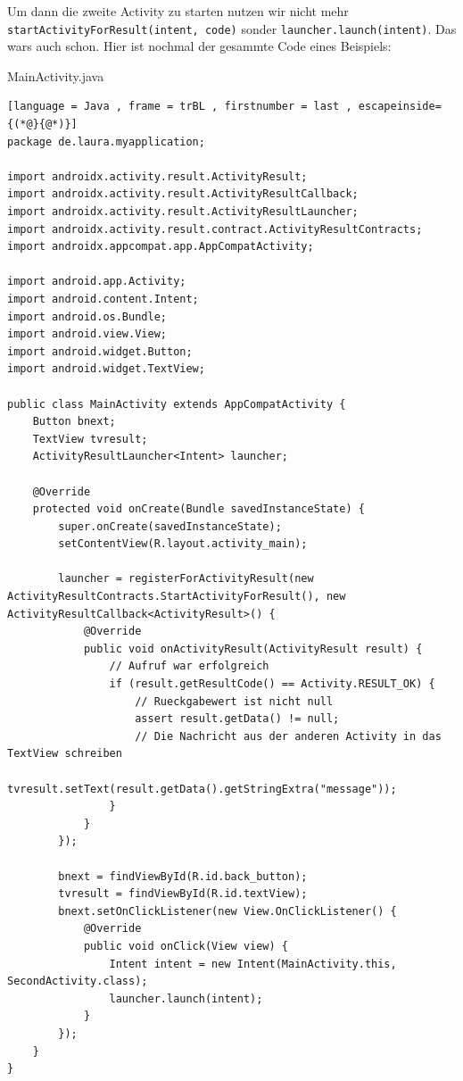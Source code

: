 \documentclass[8pt, letterpaper]{article}
\begin{document}
Um dann die zweite Activity zu starten nutzen wir nicht mehr \texttt{startActivityForResult(intent, code)} sonder \texttt{launcher.launch(intent)}.
Das wars auch schon. Hier ist nochmal der gesammte Code eines Beispiels:
\pagebreak

MainActivity.java
\begin{lstlisting}[language = Java , frame = trBL , firstnumber = last , escapeinside={(*@}{@*)}]
package de.laura.myapplication;

import androidx.activity.result.ActivityResult;
import androidx.activity.result.ActivityResultCallback;
import androidx.activity.result.ActivityResultLauncher;
import androidx.activity.result.contract.ActivityResultContracts;
import androidx.appcompat.app.AppCompatActivity;

import android.app.Activity;
import android.content.Intent;
import android.os.Bundle;
import android.view.View;
import android.widget.Button;
import android.widget.TextView;

public class MainActivity extends AppCompatActivity {
    Button bnext;
    TextView tvresult;
    ActivityResultLauncher<Intent> launcher;

    @Override
    protected void onCreate(Bundle savedInstanceState) {
        super.onCreate(savedInstanceState);
        setContentView(R.layout.activity_main);

        launcher = registerForActivityResult(new ActivityResultContracts.StartActivityForResult(), new ActivityResultCallback<ActivityResult>() {
            @Override
            public void onActivityResult(ActivityResult result) {
                // Aufruf war erfolgreich
                if (result.getResultCode() == Activity.RESULT_OK) {
                    // Rueckgabewert ist nicht null
                    assert result.getData() != null;
                    // Die Nachricht aus der anderen Activity in das TextView schreiben
                    tvresult.setText(result.getData().getStringExtra("message"));
                }
            }
        });

        bnext = findViewById(R.id.back_button);
        tvresult = findViewById(R.id.textView);
        bnext.setOnClickListener(new View.OnClickListener() {
            @Override
            public void onClick(View view) {
                Intent intent = new Intent(MainActivity.this, SecondActivity.class);
                launcher.launch(intent);
            }
        });
    }
}
\end{lstlisting}

% 
\end{document}
